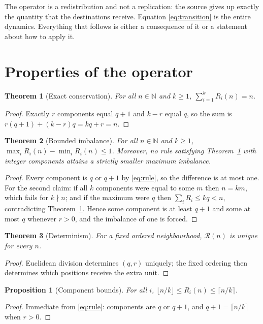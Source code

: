 \documentclass[11pt,a4paper]{article}
\newtheorem{theorem}{Theorem}
\newtheorem{proposition}{Proposition}
\theoremstyle{definition}
\newcommand{\N}{\mathbb{N}}
\newcommand{\R}{\mathcal{R}}
\begin{document}
The operator is a redistribution and not a replication: the source gives up
exactly the quantity that the destinations receive. Equation
\eqref{eq:transition} is the entire dynamics. Everything that follows is either
a consequence of it or a statement about how to apply it.

\section{Properties of the operator}\label{sec:props}

\begin{theorem}[Exact conservation]\label{thm:cons}
For all $n \in \N$ and $k \geq 1$, $\sum_{i=1}^{k} R_i(n) = n$.
\end{theorem}
\begin{proof}
Exactly $r$ components equal $q+1$ and $k-r$ equal $q$, so the sum is
$r(q+1) + (k-r)q = kq + r = n$.
\end{proof}

\begin{theorem}[Bounded imbalance]\label{thm:bal}
For all $n \in \N$ and $k \geq 1$,
$\max_i R_i(n) - \min_i R_i(n) \leq 1$. Moreover, no rule satisfying
Theorem~\ref{thm:cons} with integer components attains a strictly smaller
maximum imbalance.
\end{theorem}
\begin{proof}
Every component is $q$ or $q+1$ by \eqref{eq:rule}, so the difference is at
most one. For the second claim: if all $k$ components were equal to some $m$
then $n = km$, which fails for $k \nmid n$; and if the maximum were $q$ then
$\sum_i R_i \leq kq < n$, contradicting Theorem~\ref{thm:cons}. Hence some
component is at least $q+1$ and some at most $q$ whenever $r > 0$, and the
imbalance of one is forced.
\end{proof}

\begin{theorem}[Determinism]
For a fixed ordered neighbourhood, $\R(n)$ is unique for every $n$.
\end{theorem}
\begin{proof}
Euclidean division determines $(q,r)$ uniquely; the fixed ordering then
determines which positions receive the extra unit.
\end{proof}

\begin{proposition}[Component bounds]
For all $i$, $\lfloor n/k \rfloor \leq R_i(n) \leq \lceil n/k \rceil$.
\end{proposition}
\begin{proof}
Immediate from \eqref{eq:rule}: components are $q$ or $q+1$, and $q+1 =
\lceil n/k \rceil$ when $r>0$.
\end{proof}
\end{document}
